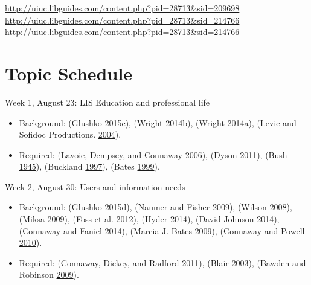 \documentclass[]{article}
\providecommand{\tightlist}{%
  \setlength{\itemsep}{0pt}\setlength{\parskip}{0pt}}
\begin{document}
\url{http://uiuc.libguides.com/content.php?pid=28713\&sid=209698}
\url{http://uiuc.libguides.com/content.php?pid=28713\&sid=214766}
\url{http://uiuc.libguides.com/content.php?pid=28713\&sid=214766}

\section{Topic Schedule}\label{topic-schedule}

Week 1, August 23: LIS Education and professional life

\begin{itemize}
\tightlist
\item
  Background: (Glushko
  \protect\hyperlink{ref-glushkoux5ffoundationux5f2015}{2015}\protect\hyperlink{ref-glushkoux5ffoundationux5f2015}{c}),
  (Wright
  \protect\hyperlink{ref-wrightux5fsecretux5f2014}{2014}\protect\hyperlink{ref-wrightux5fsecretux5f2014}{b}),
  (Wright
  \protect\hyperlink{ref-wrightux5fcatalogingux5f2014}{2014}\protect\hyperlink{ref-wrightux5fcatalogingux5f2014}{a}),
  (Levie and Sofidoc Productions.
  \protect\hyperlink{ref-levieux5fmanux5f2004}{2004}).
\item
  Required: (Lavoie, Dempsey, and Connaway
  \protect\hyperlink{ref-lavoieux5fmakingux5f2006}{2006}), (Dyson
  \protect\hyperlink{ref-dysonux5fhowux5f2011}{2011}), (Bush
  \protect\hyperlink{ref-bushux5fasux5f1945}{1945}), (Buckland
  \protect\hyperlink{ref-bucklandux5fwhatux5f1997}{1997}), (Bates
  \protect\hyperlink{ref-batesux5finvisibleux5f1999}{1999}).
\end{itemize}

Week 2, August 30: Users and information needs

\begin{itemize}
\tightlist
\item
  Background: (Glushko
  \protect\hyperlink{ref-glushkoux5finteractionsux5f2015}{2015}\protect\hyperlink{ref-glushkoux5finteractionsux5f2015}{d}),
  (Naumer and Fisher
  \protect\hyperlink{ref-naumerux5finformationux5f2009}{2009}), (Wilson
  \protect\hyperlink{ref-wilsonux5finformationux5f2008}{2008}), (Miksa
  \protect\hyperlink{ref-miksaux5finformationux5f2009}{2009}), (Foss et
  al. \protect\hyperlink{ref-fossux5fchildrensux5f2012}{2012}), (Hyder
  \protect\hyperlink{ref-hyderux5freadingux5f2014}{2014}), (David
  Johnson
  \protect\hyperlink{ref-davidux5fjohnsonux5fhealth-relatedux5f2014}{2014}),
  (Connaway and Faniel
  \protect\hyperlink{ref-connawayux5freorderingux5f2014}{2014}), (Marcia
  J. Bates
  \protect\hyperlink{ref-marciaux5fj.ux5fbatesux5finformationux5f2009}{2009}),
  (Connaway and Powell
  \protect\hyperlink{ref-connawayux5fselectingux5f2010}{2010}).
\item
  Required: (Connaway, Dickey, and Radford
  \protect\hyperlink{ref-connawayux5fifux5f2011}{2011}), (Blair
  \protect\hyperlink{ref-blairux5freadingux5f2003}{2003}), (Bawden and
  Robinson \protect\hyperlink{ref-bawdenux5fdarkux5f2009}{2009}).
\end{itemize}
\end{document}
